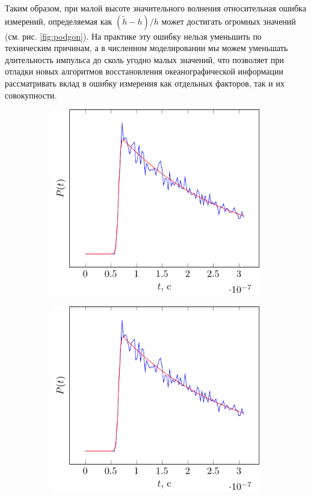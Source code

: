 Таким образом, при малой высоте значительного волнения относительная ошибка
измерений, определяемая как $(\tilde h - h)/h$ может достигать огромных значений (см. рис. \ref{fig:podgon}). На
практике эту ошибку нельзя уменьшить по техническим причинам, а в численном
моделировании мы можем уменьшать длительность импульса до сколь угодно малых
значений, что позволяет при отладки новых алгоритмов восстановления
океанографической информации рассматривать вклад в ошибку измерения как
отдельных факторов, так и их совокупности.


\begin{figure}[H]
    \centering
    \begin{subfigure}{0.49\linewidth}
        \centering
        \includegraphics[width=\linewidth,page=1]{fig/retracking/model}
    \end{subfigure}
    \begin{subfigure}{0.49\linewidth}
        \centering
        \includegraphics[width=\linewidth,page=3]{fig/retracking/model}

\end{subfigure}
\end{figure}
